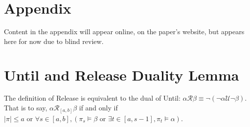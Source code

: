 \documentclass[runningheads]{llncs}
\begin{document}
%
%
%



\newpage

\appendix
\section*{Appendix} \label{Appendix}
\renewcommand{\thesection}{\Roman{section}}
Content in the appendix will appear online, on the paper's website, but appears here for now due to blind review.
 
 \section{Until and Release Duality Lemma} \label{duality appendix}
 \begin{lemma}\label{dual_proof}
 The definition of Release is equivalent to the dual of Until: 
 $\alpha \mathcal{R} \beta \equiv \neg (\neg \alpha \mathcal{U} \neg \beta)$. That is to say,
$\alpha \mathcal{R}_{[a,b]} \beta$ if and only if $|\pi| \le a \text{ or } \forall s \in [a,b] ,(\pi_s \vDash \beta \text{ or } \exists t \in [a, s-1] , \pi_t \vDash \alpha)$.
 \end{lemma}
 
\end{document}
